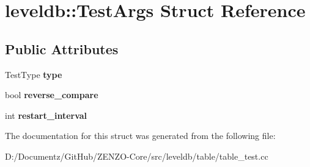 \hypertarget{structleveldb_1_1_test_args}{}\section{leveldb\+::Test\+Args Struct Reference}
\label{structleveldb_1_1_test_args}
\subsection*{Public Attributes}
\begin{DoxyCompactItemize}
\item 
\mbox{\label{structleveldb_1_1_test_args_a1c2c14e2506bf6c238a2685c38eb16ac}} 
Test\+Type {\bfseries type}
\item 
\mbox{\label{structleveldb_1_1_test_args_ab4c8bef944a4ddf845378f1fce2b6c22}} 
bool {\bfseries reverse\+\_\+compare}
\item 
\mbox{\label{structleveldb_1_1_test_args_a233f5e5e56ff872e26f543585824df1d}} 
int {\bfseries restart\+\_\+interval}
\end{DoxyCompactItemize}


The documentation for this struct was generated from the following file\+:\begin{DoxyCompactItemize}
\item 
D\+:/\+Documentz/\+Git\+Hub/\+Z\+E\+N\+Z\+O-\/\+Core/src/leveldb/table/table\+\_\+test.\+cc\end{DoxyCompactItemize}
